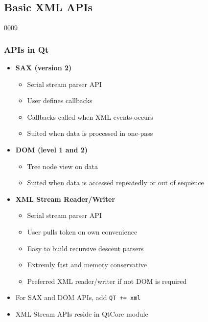 %
%
%
%

\subsection{Basic XML APIs}


\begin{slide}[fragile]{0009}
\frametitle{ APIs in Qt} \label{xml}
\begin{itemize}
\item \textbf{SAX (version 2)}
  \begin{itemize}
  \item Serial stream parser API
  \item User defines callbacks
  \item Callbacks called when XML events occurs
  \item Suited when data is processed in one-pass
  \end{itemize}
\item\textbf{ DOM (level 1 and 2)}
  \begin{itemize}
  \item Tree node view on data
  \item Suited when data is accessed repeatedly or out of sequence 
  \end{itemize}
\item \textbf{XML Stream Reader/Writer}
  \begin{itemize}
  \item Serial stream parser API
  \item User pulls token on own convenience
  \item Easy to build recursive descent parsers
  \item Extremly fast and memory conservative
  \item Preferred XML reader/writer if not DOM is required
  \end{itemize}
\item For  SAX and DOM APIs, add \verb!QT += xml!
\item XML Stream APIs reside in QtCore module
\end{itemize}
\end{slide}

